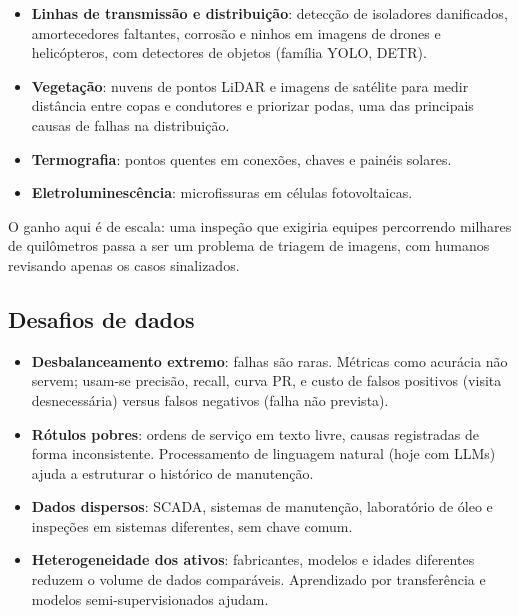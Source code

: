 \documentclass[11pt,a4paper]{article}
\begin{document}
\begin{itemize}
  \item \textbf{Linhas de transmissão e distribuição}: detecção de isoladores
    danificados, amortecedores faltantes, corrosão e ninhos em imagens de
    drones e helicópteros, com detectores de objetos (família YOLO, DETR).
  \item \textbf{Vegetação}: nuvens de pontos LiDAR e imagens de satélite para
    medir distância entre copas e condutores e priorizar podas, uma das
    principais causas de falhas na distribuição.
  \item \textbf{Termografia}: pontos quentes em conexões, chaves e painéis
    solares.
  \item \textbf{Eletroluminescência}: microfissuras em células fotovoltaicas.
\end{itemize}
O ganho aqui é de escala: uma inspeção que exigiria equipes percorrendo
milhares de quilômetros passa a ser um problema de triagem de imagens, com
humanos revisando apenas os casos sinalizados.

\subsection{Desafios de dados}
\begin{itemize}
  \item \textbf{Desbalanceamento extremo}: falhas são raras. Métricas como
    acurácia não servem; usam-se precisão, recall, curva PR, e custo de falsos
    positivos (visita desnecessária) versus falsos negativos (falha não
    prevista).
  \item \textbf{Rótulos pobres}: ordens de serviço em texto livre, causas
    registradas de forma inconsistente. Processamento de linguagem natural
    (hoje com LLMs) ajuda a estruturar o histórico de manutenção.
  \item \textbf{Dados dispersos}: SCADA, sistemas de manutenção, laboratório de
    óleo e inspeções em sistemas diferentes, sem chave comum.
  \item \textbf{Heterogeneidade dos ativos}: fabricantes, modelos e idades
    diferentes reduzem o volume de dados comparáveis. Aprendizado por
    transferência e modelos semi-supervisionados ajudam.
\end{itemize}
\end{document}
